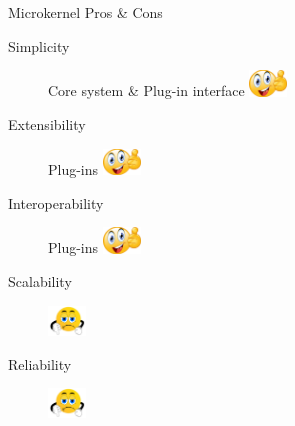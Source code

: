 \documentclass{slide}
\begin{document}
\begin{frame}{Microkernel Pros \& Cons}
    \vspace{1mm}
    {\huge
    \begin{description}
        \item[Simplicity] Core system \& Plug-in interface \tabto{16em}\includegraphics[width=10mm]{../../shared/images/thumbs-up.png}
        \item[Extensibility] Plug-ins \tabto{16em}\includegraphics[width=10mm]{../../shared/images/thumbs-up.png}
        \item[Interoperability] Plug-ins \tabto{16em}\includegraphics[width=10mm]{../../shared/images/thumbs-up.png}
        \item[Scalability] \tabto{16em}\includegraphics[trim=22 19 22 15,clip,width=10mm]{../../shared/images/thumbs-down.png}
        \item[Reliability] \tabto{16em}\includegraphics[trim=22 19 22 15,clip,width=10mm]{../../shared/images/thumbs-down.png}
    \end{description}
    }
\end{frame}
\end{document}
